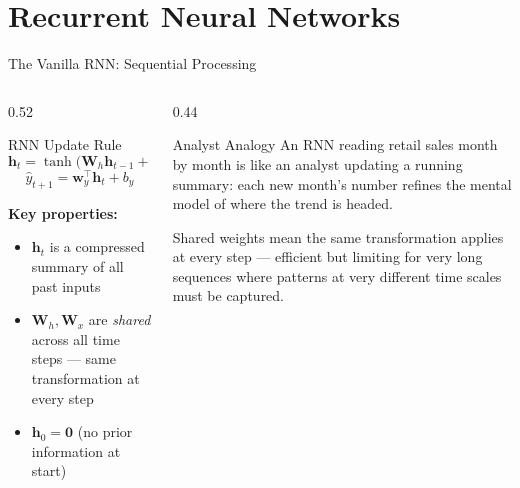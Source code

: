 \documentclass[aspectratio=169, 10pt]{beamer}
\begin{document}
\section{Recurrent Neural Networks}


\begin{frame}{The Vanilla RNN: Sequential Processing}
  \begin{columns}[T]
    \begin{column}{0.52\textwidth}
      \begin{definitionbox}{RNN Update Rule}
        \[
          \mathbf{h}_t = \tanh\!\bigl(
            \mathbf{W}_h \mathbf{h}_{t-1}
            + \mathbf{W}_x \mathbf{x}_t
            + \mathbf{b}
          \bigr)
        \]
        \[
          \hat{y}_{t+1} = \mathbf{w}_y^\top \mathbf{h}_t + b_y
        \]
      \end{definitionbox}

      \smallskip
      \textbf{Key properties:}
      \begin{itemize}
        \item $\mathbf{h}_t$ is a compressed summary of all past inputs
        \item $\mathbf{W}_h, \mathbf{W}_x$ are \emph{shared} across all
              time steps --- same transformation at every step
        \item $\mathbf{h}_0 = \mathbf{0}$ (no prior information at start)
      \end{itemize}
    \end{column}
    \begin{column}{0.44\textwidth}
      \begin{examplebox}{Analyst Analogy}
        \footnotesize
        An RNN reading retail sales month by month is like an analyst
        updating a running summary: each new month's number refines the
        mental model of where the trend is headed.
      \end{examplebox}

      \medskip
      \begin{warningbox}
        \footnotesize
        Shared weights mean the same transformation applies at every
        step --- efficient but limiting for very long sequences where
        patterns at very different time scales must be captured.
      \end{warningbox}
    \end{column}
  \end{columns}
\end{frame}
\end{document}
